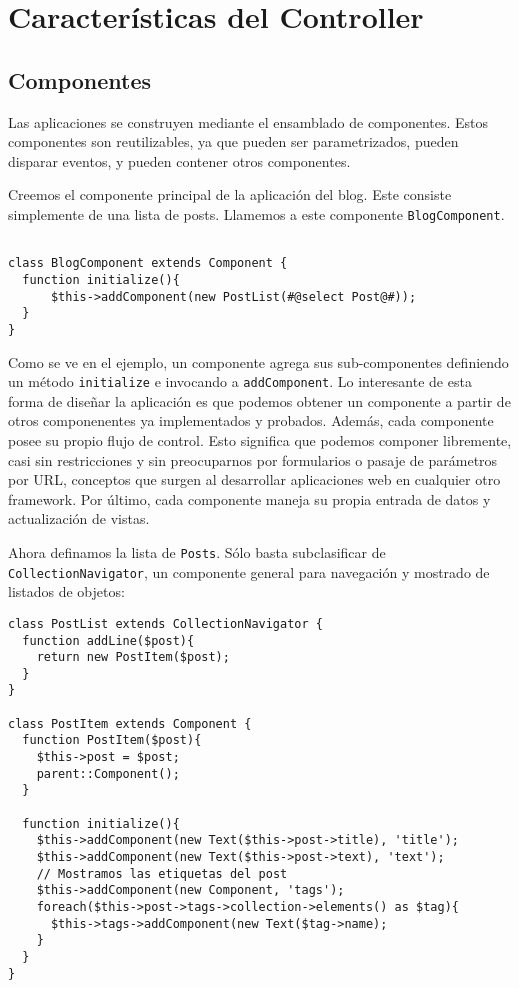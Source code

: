 \section{Características del Controller}
\label{sec-controller}
\subsection{Componentes}
\label{sub-comp}

Las aplicaciones se construyen mediante el ensamblado de componentes. Estos componentes son reutilizables, ya que pueden ser parametrizados, pueden disparar eventos, y pueden contener otros componentes.

Creemos el componente principal de la aplicación del blog. Este consiste simplemente de una lista de posts. Llamemos a este componente \verb"BlogComponent".

\begin{verbatim}

class BlogComponent extends Component {
  function initialize(){
      $this->addComponent(new PostList(#@select Post@#));
  }
}
\end{verbatim}

Como se ve en el ejemplo, un componente agrega sus sub-componentes definiendo un método \verb"initialize" e invocando a \verb"addComponent". Lo interesante de esta forma de diseñar la aplicación es que podemos obtener un componente a partir de otros componenentes ya implementados y probados. Además, cada componente posee su propio flujo de control. Esto significa que podemos componer libremente, casi sin restricciones y sin preocuparnos por formularios o pasaje de parámetros por URL, conceptos que surgen al desarrollar aplicaciones web en cualquier otro framework. Por último, cada componente maneja su propia entrada de datos y actualización de vistas.

Ahora definamos la lista de \verb"Posts". Sólo basta subclasificar de \verb"CollectionNavigator", un componente general para navegación y mostrado de listados de objetos:

\begin{verbatim}
class PostList extends CollectionNavigator {
  function addLine($post){
    return new PostItem($post);
  }
}

class PostItem extends Component {
  function PostItem($post){
    $this->post = $post;
    parent::Component();
  }

  function initialize(){
    $this->addComponent(new Text($this->post->title), 'title');
    $this->addComponent(new Text($this->post->text), 'text');
    // Mostramos las etiquetas del post
    $this->addComponent(new Component, 'tags');
    foreach($this->post->tags->collection->elements() as $tag){
      $this->tags->addComponent(new Text($tag->name);
    }
  }
}

\end{verbatim}


